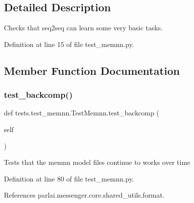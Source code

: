 \subsection{Detailed Description}
\begin{DoxyVerb}Checks that seq2seq can learn some very basic tasks.\end{DoxyVerb}
 

Definition at line 15 of file test\+\_\+memnn.\+py.



\subsection{Member Function Documentation}
\mbox{\label{classtests_1_1test__memnn_1_1TestMemnn_a2c3a2e42a94e00651ee32a03d9b7ba84}} 
\subsubsection{\texorpdfstring{test\+\_\+backcomp()}{test\_backcomp()}}
{\footnotesize\ttfamily def tests.\+test\+\_\+memnn.\+Test\+Memnn.\+test\+\_\+backcomp (\begin{DoxyParamCaption}\item[{}]{self }\end{DoxyParamCaption})}

\begin{DoxyVerb}Tests that the memnn model files continue to works over time
\end{DoxyVerb}
 

Definition at line 80 of file test\+\_\+memnn.\+py.



References parlai.\+messenger.\+core.\+shared\+\_\+utils.\+format.

\mbox{\label{classtests_1_1test__memnn_1_1TestMemnn_a2e52386c91c00701e4e58c72e100074d}} 
